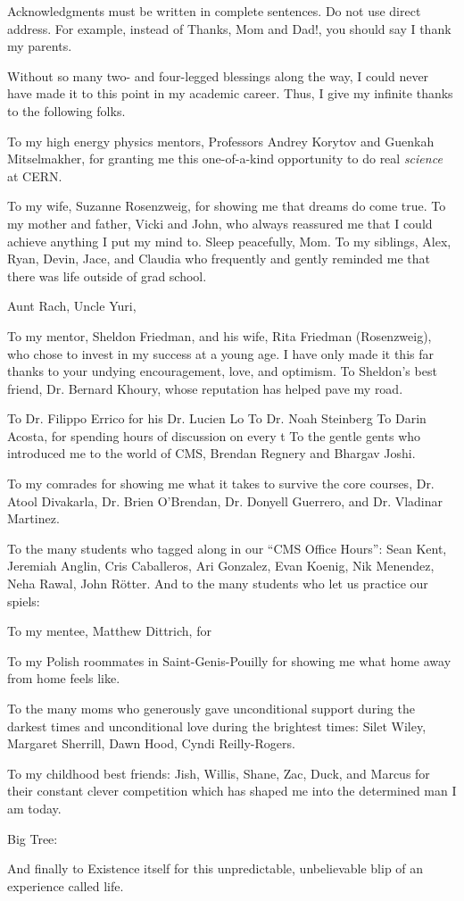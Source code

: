 Acknowledgments must be written in complete sentences. Do not use direct address. For example, instead of Thanks, Mom and Dad!, you should say I thank my parents.

Without so many two- and four-legged blessings along the way, I could never have made it to this point in my academic career.
Thus, I give my infinite thanks to the following folks.

To my high energy physics mentors, Professors Andrey Korytov and Guenkah Mitselmakher, for granting me this one-of-a-kind opportunity to do real \emph{science} at CERN.

To my wife, Suzanne Rosenzweig, for showing me that dreams do come true.
To my mother and father, Vicki and John, who always reassured me that I could achieve anything I put my mind to. Sleep peacefully, Mom.
To my siblings, Alex, Ryan, Devin, Jace, and Claudia who frequently and gently reminded me that there was life outside of grad school.

Aunt Rach, Uncle Yuri,

To my mentor, Sheldon Friedman, and his wife, Rita Friedman (Rosenzweig), who chose to invest in my success at a young age.
I have only made it this far thanks to your undying encouragement, love, and optimism.
To Sheldon's best friend, Dr. Bernard Khoury, whose reputation has helped pave my road.

To Dr. Filippo Errico for his 
Dr. Lucien Lo
To Dr. Noah Steinberg
To Darin Acosta, for spending hours of discussion on every t
To the gentle gents who introduced me to the world of CMS, Brendan Regnery and Bhargav Joshi.

To my comrades for showing me what it takes to survive the core courses,
Dr. Atool Divakarla, Dr. Brien O'Brendan, Dr. Donyell Guerrero, and Dr. Vladinar Martinez.

To the many students who tagged along in our ``CMS Office Hours'':
Sean Kent, Jeremiah Anglin, Cris Caballeros, Ari Gonzalez, 
Evan Koenig, Nik Menendez, Neha Rawal, John Rötter.
And to the many students who let us practice our spiels:


To my mentee, Matthew Dittrich, for 

To my Polish roommates in Saint-Genis-Pouilly for showing me what home away from home feels like.

To the many moms who generously gave unconditional support during the darkest times and unconditional love during the brightest times:
Silet Wiley, Margaret Sherrill, Dawn Hood, Cyndi Reilly-Rogers.

To my childhood best friends:
Jish, Willis, Shane, Zac, Duck, and Marcus for their constant clever competition which has shaped me into the determined man I am today.

Big Tree:

And finally to Existence itself for this unpredictable, unbelievable blip of an experience called life.
